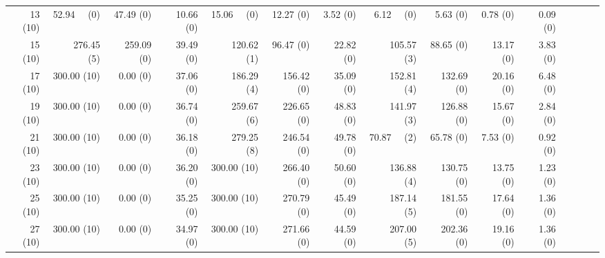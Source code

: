 \documentclass[11pt,fleqn,twoside]{article}
\begin{document}
{\begin{table}[t]
\begin{tabular}[t]{|r|r|r|r|r|r|r|r|r|r|r|r|r|r|r|}
13 (10) & 52.94 ~~(0) & 47.49 (0) & 10.66 (0) & 15.06 ~~(0) & 12.27 (0) & 3.52 (0) & 6.12 ~~(0) & 5.63 (0) & 0.78 (0) & 0.09 (0) \\
15 (10) & 276.45 ~~(5) & 259.09 (0) & 39.49 (0) & 120.62 ~~(1) & 96.47 (0) & 22.82 (0) & 105.57 ~~(3) & 88.65 (0) & 13.17 (0) & 3.83 (0) \\
17 (10) & 300.00 (10) & 0.00 (0) & 37.06 (0) & 186.29 ~~(4) & 156.42 (0) & 35.09 (0) & 152.81 ~~(4) & 132.69 (0) & 20.16 (0) & 6.48 (0) \\
19 (10) & 300.00 (10) & 0.00 (0) & 36.74 (0) & 259.67 ~~(6) & 226.65 (0) & 48.83 (0) & 141.97 ~~(3) & 126.88 (0) & 15.67 (0) & 2.84 (0) \\
21 (10) & 300.00 (10) & 0.00 (0) & 36.18 (0) & 279.25 ~~(8) & 246.54 (0) & 49.78 (0) & 70.87 ~~(2) & 65.78 (0) & 7.53 (0) & 0.92 (0) \\
23 (10) & 300.00 (10) & 0.00 (0) & 36.20 (0) & 300.00 (10) & 266.40 (0) & 50.60 (0) & 136.88 ~~(4) & 130.75 (0) & 13.75 (0) & 1.23 (0) \\
25 (10) & 300.00 (10) & 0.00 (0) & 35.25 (0) & 300.00 (10) & 270.79 (0) & 45.49 (0) & 187.14 ~~(5) & 181.55 (0) & 17.64 (0) & 1.36 (0) \\
27 (10) & 300.00 (10) & 0.00 (0) & 34.97 (0) & 300.00 (10) & 271.66 (0) & 44.59 (0) & 207.00 ~~(5) & 202.36 (0) & 19.16 (0) & 1.36 (0) \\

\end{tabular}
\end{table}}
\end{document}
